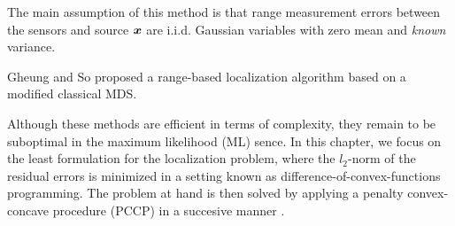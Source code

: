 The main assumption of this method is that range measurement errors between the sensors and source $\mbox{\boldmath$x$}$ are i.i.d. Gaussian variables with zero mean and \textit{known} variance.

Gheung and So \cite{classMDS} proposed a range-based localization algorithm based on a modified classical MDS.  %



Although these methods are efficient in terms of complexity, they remain to be suboptimal in the maximum likelihood (ML) sence. In this chapter, we focus on the least  formulation for the localization problem, where the $l_2$-norm of the residual errors is minimized in a setting known as difference-of-convex-functions programming. The problem at hand is then solved by applying a penalty convex-concave procedure (PCCP) in a succesive manner \cite{PCCP}.


